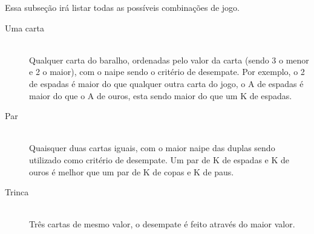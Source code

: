 \documentclass[12pt]{article}
\begin{document}
Essa subseção irá listar todas as possíveis combinações de jogo.

\begin{description}

\item[Uma carta] \hfill \\
 Qualquer carta do baralho, ordenadas pelo valor da carta (sendo 3 o menor e 2 o maior), com o naipe sendo o critério de desempate. Por exemplo, o 2 de espadas é maior do que qualquer outra carta do jogo, o A de espadas é maior do que o A de ouros, esta sendo maior do que um K de espadas.

\vspace{0.4 true cm}

\item[Par] \hfill \\
 Quaisquer duas cartas iguais, com o maior naipe das duplas sendo utilizado como critério de desempate. Um par de K de espadas e K de ouros é melhor que um par de K de copas e K de paus.

\vspace{0.4 true cm}

\item[Trinca] \hfill \\
 Três cartas de mesmo valor, o desempate é feito através do maior valor.

\vspace{0.4 true cm}


\end{description}
\end{document}
